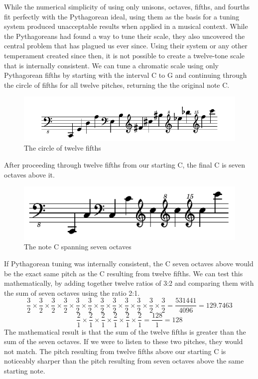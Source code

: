 While the numerical simplicity of using only unisons, octaves, fifths, and fourths fit
perfectly with the Pythagorean ideal, using them as the basis for a tuning system produced
unacceptable results when applied in a musical context. While the Pythagoreans had found
a way to tune their scale, they also uncovered the central problem that has plagued us ever
since. Using their system or any other temperament created since then, it is not possible
to create a twelve-tone scale that is internally consistent. We can tune a chromatic
scale using only Pythagorean fifths by starting with the interval C to G and continuing
through the circle of fifths for all twelve pitches, returning the the original note C.
\begin{figure}[h]
\centering
\includegraphics{examples/12-fifths.pdf}
\caption{The circle of twelve fifths}
\end{figure}
After proceeding through twelve fifths from our starting C, the final C is seven octaves
above it.
\begin{figure}[h]
\centering
\includegraphics{examples/7-octaves.pdf}
\caption{The note C spanning seven octaves}
\end{figure}
If Pythagorean tuning was internally consistent, the C seven octaves above would be the
exact same pitch as the C resulting from twelve fifths. We can test this mathematically,
by adding together twelve ratios of 3:2 and comparing them with the sum of seven octaves
using the ratio 2:1.\autocite[25]{RD:1}
\begin{equation}
  \frac{3}{2} \times
  \frac{3}{2} \times
  \frac{3}{2} \times
  \frac{3}{2} \times
  \frac{3}{2} \times
  \frac{3}{2} \times
  \frac{3}{2} \times
  \frac{3}{2} \times
  \frac{3}{2} \times
  \frac{3}{2} \times
  \frac{3}{2} \times
  \frac{3}{2} = \frac{531441}{4096} = 129.7463
\end{equation}
\begin{equation}
  \frac{2}{1} \times
  \frac{2}{1} \times
  \frac{2}{1} \times
  \frac{2}{1} \times
  \frac{2}{1} \times
  \frac{2}{1} = \frac{128}{1} = 128
\end{equation}
The mathematical result is that the sum of the twelve fifths is greater than the sum of
the seven octaves. If we were to listen to these two pitches, they would not match.
The pitch resulting from twelve fifths above our starting C is noticeably sharper than 
the pitch resulting from seven octaves above the same starting note.

